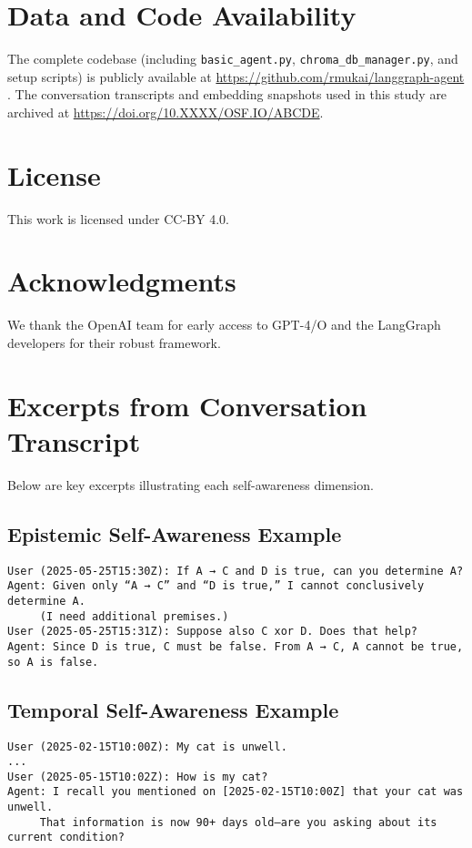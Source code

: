 \documentclass[11pt]{article}
\begin{document}
\section*{Data and Code Availability}
The complete codebase (including \texttt{basic\_agent.py}, \texttt{chroma\_db\_manager.py}, and setup scripts) is publicly available at \url{https://github.com/rmukai/langgraph-agent} \cite{LangGraphAgent2025}. The conversation transcripts and embedding snapshots used in this study are archived at \url{https://doi.org/10.XXXX/OSF.IO/ABCDE}.

\section*{License}
This work is licensed under CC-BY 4.0.

\section*{Acknowledgments}
We thank the OpenAI team for early access to GPT-4/O and the LangGraph developers for their robust framework.

\appendix
\section{Excerpts from Conversation Transcript}
Below are key excerpts illustrating each self-awareness dimension.

\subsection{Epistemic Self-Awareness Example}
\begin{verbatim}
User (2025-05-25T15:30Z): If A → C and D is true, can you determine A?
Agent: Given only “A → C” and “D is true,” I cannot conclusively determine A.
     (I need additional premises.)
User (2025-05-25T15:31Z): Suppose also C xor D. Does that help?
Agent: Since D is true, C must be false. From A → C, A cannot be true, so A is false.
\end{verbatim}

\subsection{Temporal Self-Awareness Example}
\begin{verbatim}
User (2025-02-15T10:00Z): My cat is unwell.
...
User (2025-05-15T10:02Z): How is my cat?
Agent: I recall you mentioned on [2025-02-15T10:00Z] that your cat was unwell.
     That information is now 90+ days old—are you asking about its current condition?
\end{verbatim}
\end{document}
